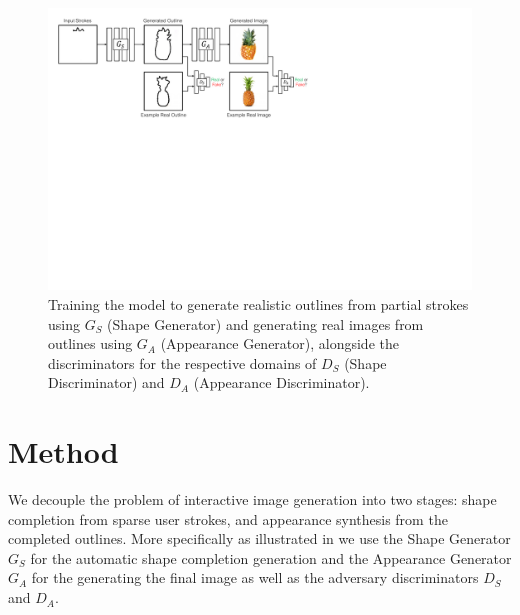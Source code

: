 \begin{figure}[ht]
    \centering
    \includegraphics[width=\linewidth]{paper_images/isf_method_v3.pdf}
    \caption{Training the model to generate realistic outlines from partial strokes using $G_S$ (Shape Generator) and generating real images from outlines using $G_A$ (Appearance Generator), alongside the discriminators for the respective domains of $D_S$ (Shape Discriminator) and $D_A$ (Appearance Discriminator).
    }\label{fig:SketchFillNet}
\end{figure}

\section{Method}
We decouple the problem of interactive image generation into two stages: shape completion from sparse user strokes, and appearance synthesis from the completed outlines. More specifically as illustrated in  we use the Shape Generator $G_S$ for the automatic shape completion generation and the Appearance Generator $G_A$ for the generating the final image as well as the adversary discriminators $D_S$ and $D_A$. %

